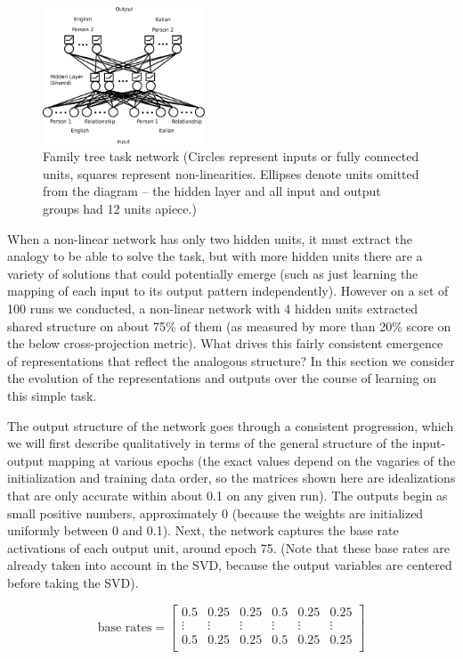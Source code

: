 \documentclass[10pt,letterpaper]{article}
\begin{document}
\begin{figure}
\centering
\includegraphics[width=0.43\textwidth]{figures/family_tree_network_diagram.png}
\caption{Family tree task network (Circles represent inputs or fully connected units, squares represent non-linearities. Ellipses denote units omitted from the diagram -- the hidden layer and all input and output groups had 12 units apiece.)}
\label{family_tree_network_diagram}
\end{figure}
When a non-linear network has only two hidden units, it must extract the analogy to be able to solve the task, but with more hidden units there are a variety of solutions that could potentially emerge (such as just learning the mapping of each input to its output pattern independently). However on a set of 100 runs we conducted, a non-linear network with 4 hidden units extracted shared structure on about 75\% of them (as measured by more than 20\% score on the below cross-projection metric). What drives this fairly consistent emergence of representations that reflect the analogous structure? In this section we consider the evolution of the representations and outputs over the course of learning on this simple task. \par 
The output structure of the network goes through a consistent progression, which we will first describe qualitatively in terms of the general structure of the input-output mapping at various epochs (the exact values depend on the vagaries of the initialization and training data order, so the matrices shown here are idealizations that are only accurate within about 0.1 on any given run). The outputs begin as small positive numbers, approximately 0 (because the weights are initialized uniformly between 0 and 0.1). Next, the network captures the base rate activations of each output unit, around epoch 75. (Note that these base rates are already taken into account in the SVD, because the output variables are centered before taking the SVD). \par
{ 
\[ 
\text{base rates} = \left[ \begin{matrix} 
0.5 & 0.25 & 0.25 & 0.5 & 0.25 & 0.25 \\
\vdots & \vdots &\vdots &\vdots &\vdots &\vdots \\
 0.5 & 0.25 & 0.25 & 0.5 & 0.25 & 0.25\\
\end{matrix}  \right] 
\] 
}
\end{document}
